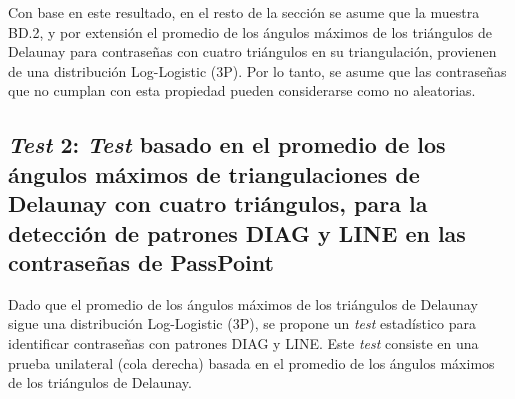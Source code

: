 \documentclass[12pt]{report}
\begin{document}

Con base en este resultado, en el resto de la sección se asume que la muestra BD.2, y por extensión el promedio de los ángulos máximos de los triángulos de Delaunay para contraseñas con cuatro triángulos en su triangulación, provienen de una distribución Log-Logistic (3P). Por lo tanto, se asume que las contraseñas que no cumplan con esta propiedad pueden considerarse como no aleatorias.
 
\subsection{\textit{Test} 2: \textit{Test} basado en el promedio de los ángulos máximos de triangulaciones de Delaunay con cuatro triángulos, para la detección de patrones DIAG y LINE en las contraseñas de PassPoint}
\label{sec:2.2}

Dado que el promedio de los ángulos máximos de los triángulos de Delaunay sigue una distribución Log-Logistic (3P), se propone un \textit{test} estadístico para identificar contraseñas con patrones DIAG y LINE. Este \textit{test} consiste en una prueba unilateral (cola derecha) basada en el promedio de los ángulos máximos de los triángulos de Delaunay.
\end{document}
